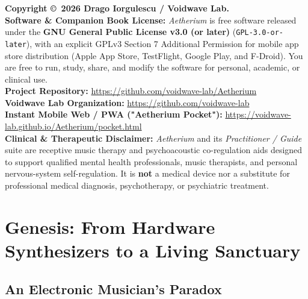 \documentclass[11pt,oneside,openany]{book}
\begin{document}
\begin{tcolorbox}[colback=BoxBg, colframe=BoxBorder, arc=4pt, boxrule=0.5pt]
\footnotesize
\textbf{Copyright \copyright\ 2026 Drago Iorgulescu / Voidwave Lab.}\\[0.4em]
\textbf{Software \& Companion Book License:} \textit{Aetherium} is free software released under the \textbf{GNU General Public License v3.0 (or later)} (\texttt{GPL-3.0-or-later}), with an explicit GPLv3 Section 7 Additional Permission for mobile app store distribution (Apple App Store, TestFlight, Google Play, and F-Droid). You are free to run, study, share, and modify the software for personal, academic, or clinical use.\\[0.4em]
\textbf{Project Repository:} \url{https://github.com/voidwave-lab/Aetherium}\\
\textbf{Voidwave Lab Organization:} \url{https://github.com/voidwave-lab}\\
\textbf{Instant Mobile Web / PWA ("Aetherium Pocket"):} \url{https://voidwave-lab.github.io/Aetherium/pocket.html}\\[0.4em]
\textbf{Clinical \& Therapeutic Disclaimer:} \textit{Aetherium} and its \textit{Practitioner / Guide} suite are receptive music therapy and psychoacoustic co-regulation aids designed to support qualified mental health professionals, music therapists, and personal nervous-system self-regulation. It is \textbf{not} a medical device nor a substitute for professional medical diagnosis, psychotherapy, or psychiatric treatment.
\end{tcolorbox}

\clearpage

\tableofcontents
\clearpage

\mainmatter

\chapter[Genesis: From Hardware to Sanctuary]{Genesis: From Hardware Synthesizers to a Living Sanctuary}

\section{An Electronic Musician's Paradox}
\end{document}
